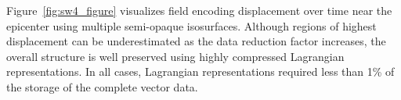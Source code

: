 Figure~\ref{fig:sw4_figure} visualizes field encoding displacement over time near the epicenter using multiple semi-opaque isosurfaces.
%
Although regions of highest displacement can be underestimated as the data reduction factor increases, the overall structure is well preserved using highly compressed Lagrangian representations.
%
In all cases, Lagrangian representations required less than 1\% of the storage of the complete vector data.
